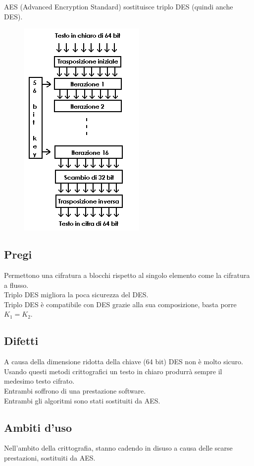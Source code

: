 AES (Advanced Encryption Standard) sostituisce triplo DES (quindi anche DES).

\begin{figure}[H]
\centering
\includegraphics[scale=0.8]{res/img/53_DES.png}
\end{figure}

\subsection{Pregi}
Permettono una cifratura a blocchi rispetto al singolo elemento come la cifratura a flusso.\\
Triplo DES migliora la poca sicurezza del DES.\\
Triplo DES è compatibile con DES grazie alla sua composizione, basta porre $K_1=K_2$.

\subsection{Difetti}
A causa della dimensione ridotta della chiave (64 bit) DES non è molto sicuro.\\
Usando questi metodi crittografici un testo in chiaro produrrà sempre il medesimo testo cifrato.\\
Entrambi soffrono di una prestazione software.\\
Entrambi gli algoritmi sono stati sostituiti da AES.

\subsection{Ambiti d'uso}
Nell'ambito della crittografia, stanno cadendo in disuso a causa delle scarse prestazioni, sostituiti da AES.

